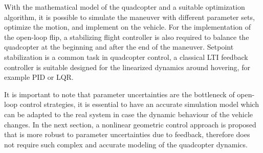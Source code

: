 

With the mathematical model of the quadcopter and a suitable optimization algorithm, it is possible to simulate the maneuver with different parameter sets, optimize the motion, and implement on the vehicle. For the implementation of the open-loop flip, a stabilizing flight controller is also required to balance the quadcopter at the beginning and after the end of the maneuver. Setpoint stabilization is a common task in quadcopter control, a classical LTI feedback controller is suitable designed for the linearized dynamics around hovering, for example PID or LQR. 

It is important to note that parameter uncertainties are the bottleneck of open-loop control strategies, it is essential to have an accurate simulation model which can be adapted to the real system in case the dynamic behaviour of the vehicle changes. In the next section, a nonlinear geometric control approach is proposed that is more robust to parameter uncertainties due to feedback, therefore does not require such complex and accurate modeling of the quadcopter dynamics.

